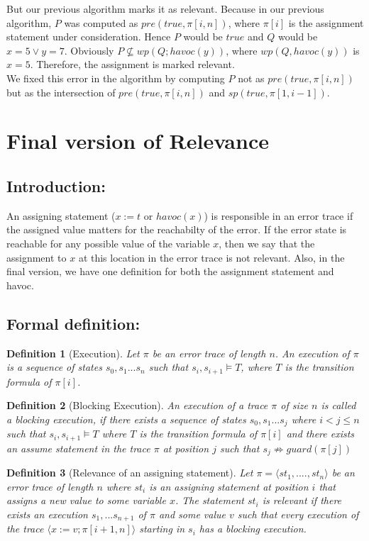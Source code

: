 \documentclass{article}
\newcommand{\limp}{\Rightarrow}
\newtheorem{mydef}{Definition}
\begin{document}
But our previous algorithm marks it as relevant. Because in our previous algorithm, $P$ was computed as $pre(true, \pi[i,n])$, where $\pi[i]$ is the assignment statement under consideration. Hence $P$ would be $true$ and $Q$ would be $x=5 \vee y=7$. Obviously $P \not \subseteq wp(Q; havoc(y))$, where $wp(Q, havoc(y))$ is $x=5$. Therefore, the assignment is marked relevant. \\
We fixed this error in the algorithm by computing $P$ not as $pre(true, \pi[i,n])$ but as the intersection of $pre(true, \pi[i,n])$ and $sp(true, \pi[1,i-1])$.




\section{Final version of Relevance}
\subsection{Introduction:}
An assigning statement ($x := t$ or $havoc(x)$) is responsible in an error trace if the assigned value matters for the reachabilty of the error. If the error state is reachable for any possible value of the variable $x$, then we say that the assignment to $x$ at this location in the error trace is not relevant. Also, in the final version, we have one definition for both the assignment statement and havoc. 
\subsection{Formal definition:}
\begin{mydef}[Execution]\label{mydef:execution}
Let $\pi$ be an error trace of length $n$. An execution of $\pi$ is a sequence of states $s_0, s_1 ... s_n$ such that $s_i, s_{i+1} \vDash T$, where $T$ is the transition formula of $\pi[i]$.
\end{mydef}
\begin{mydef}[Blocking Execution]\label{mydef:blocked_execution}
An execution of a trace $\pi$ of size $n$ is called a blocking execution, if there exists a sequence of states $s_0,s_1...s_j$ where $i<j \leq n$ such that $s_i, s_{i+1} \vDash T$ where $T$ is the transition formula of $\pi[i]$ and there exists an assume statement in the trace $\pi$ at position $j$ such that $s_j \not \limp guard(\pi[j])$
\end{mydef}

\begin{mydef}[Relevance of an assigning statement]\label{mydef:responsible}
Let $\pi = \langle st_1,....,st_n \rangle$ be an error trace of length $n$ where $st_i$ is an assigning statement at position $i$ that assigns a new value to some variable $x$. The statement $st_i$ is relevant if there exists an execution $s_1,...s_{n+1}$ of $\pi$ and some value $v$ such that every execution of the trace $\langle x:=v; \pi[i+1,n] \rangle$ starting in $s_i$ has a blocking execution.
\end{mydef}
\end{document}
